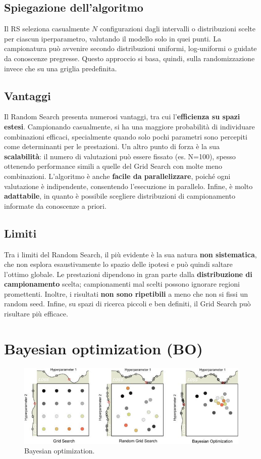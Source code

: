 \documentclass[a4paper,12pt]{report}
\begin{document}
	\subsection{Spiegazione dell'algoritmo}
	Il RS seleziona casualmente $N$ configurazioni dagli intervalli o distribuzioni scelte per ciascun iperparametro, valutando il modello solo in quei punti. La campionatura può avvenire secondo distribuzioni uniformi, log-uniformi o guidate da conoscenze pregresse. Questo approccio si basa, quindi, sulla randomizzazione invece che su una griglia predefinita.
	
	\subsection{Vantaggi}
	Il Random Search presenta numerosi vantaggi, tra cui l'\textbf{efficienza su spazi estesi}. Campionando casualmente, si ha una maggiore probabilità di individuare combinazioni efficaci, specialmente quando solo pochi parametri sono percepiti come determinanti per le prestazioni. Un altro punto di forza è la sua \textbf{scalabilità}: il numero di valutazioni può essere fissato (es. N=100), spesso ottenendo performance simili a quelle del Grid Search con molte meno combinazioni. L'algoritmo è anche \textbf{facile da parallelizzare}, poiché ogni valutazione è indipendente, consentendo l'esecuzione in parallelo. Infine, è molto \textbf{adattabile}, in quanto è possibile scegliere distribuzioni di campionamento informate da conoscenze a priori.
	
	\subsection{Limiti}
	Tra i limiti del Random Search, il più evidente è la sua natura \textbf{non sistematica}, che non esplora esaustivamente lo spazio delle ipotesi e può quindi saltare l'ottimo globale. Le prestazioni dipendono in gran parte dalla \textbf{distribuzione di campionamento} scelta; campionamenti mal scelti possono ignorare regioni promettenti. Inoltre, i risultati \textbf{non sono ripetibili} a meno che non si fissi un random seed. Infine, su spazi di ricerca piccoli e ben definiti, il Grid Search può risultare più efficace.
	
	\section{Bayesian optimization (BO)}
	\begin{figure}[H]
		\centering
		\includegraphics[width=1.0\textwidth]{img/bo.jpg}
		\caption{Bayesian optimization.}
	\end{figure}
\end{document}

